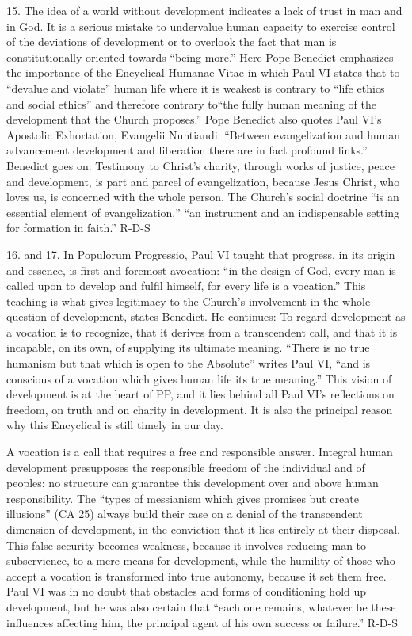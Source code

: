 \documentclass[oneside]{book}
\begin{document}
15. The idea of a world without development indicates a lack of trust in man and
in God. It is a serious mistake to undervalue human capacity to exercise control
of the deviations of development or to overlook the fact that man is
constitutionally oriented towards ``being more.''
Here Pope Benedict emphasizes the importance of the Encyclical Humanae Vitae in
which Paul VI states that to ``devalue and violate'' human life where it is
weakest is contrary to ``life ethics and social ethics'' and therefore contrary
to``the fully human meaning of the development that the Church proposes.'' Pope
Benedict also quotes Paul VI's Apostolic Exhortation, Evangelii Nuntiandi:
``Between evangelization and human advancement  development and liberation
there are in fact profound links.'' Benedict goes on: Testimony to Christ's
charity, through works of justice, peace and development, is part and parcel of
evangelization, because Jesus Christ, who loves us, is concerned with the whole
person. The Church's social doctrine ``is an essential element of
evangelization,'' ``an instrument and an indispensable setting for formation in
faith.''
R-D-S

16. and 17. In Populorum Progressio, Paul VI taught that progress, in its origin
and essence, is first and foremost avocation: ``in the design of God, every man
is called upon to develop and fulfil himself, for every life is a vocation.''
This teaching is what gives legitimacy to the Church's involvement in the whole
question of development, states Benedict. He continues: To regard development as
a vocation is to recognize, that it derives from a transcendent call, and that
it is incapable, on its own, of supplying its ultimate meaning. ``There is no
true humanism but that which is open to the Absolute'' writes Paul VI, ``and is
conscious of a vocation which gives human life its true meaning.'' This vision
of development is at the heart of PP, and it lies behind all Paul VI's
reflections on freedom, on truth and on charity in development. It is also the
principal reason why this Encyclical is still timely in our day.

A vocation is a call that requires a free and responsible answer. Integral human
development presupposes the responsible freedom of the individual and of
peoples: no structure can guarantee this development over and above human
responsibility. The ``types of messianism which gives promises but create
illusions'' (CA 25) always build their case on a denial of the transcendent
dimension of development, in the conviction that it lies entirely at their
disposal. This false security becomes weakness, because it involves reducing man
to subservience, to a mere means for development, while the humility of those
who accept a vocation is transformed into true autonomy, because it set them
free. Paul VI was in no doubt that obstacles and forms of conditioning hold up
development, but he was also certain that ``each one remains, whatever be these
influences affecting him, the principal agent of his own success or failure.''
R-D-S
\end{document}
